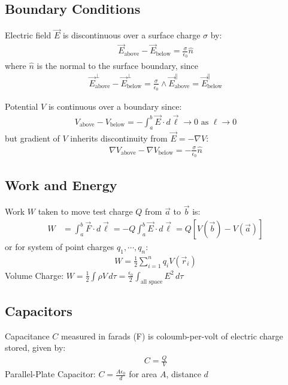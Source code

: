 \documentclass[12pt, a4paper]{article}
\begin{document}
\begin{multicols*}{3}
\subsection{Boundary Conditions}

Electric field $\vec{E}$ is discontinuous over a surface charge $\sigma$ by:
\begin{align*}
  \vec{E}_{\text{above}} - \vec{E}_{\text{below}} = \frac{\sigma}{\epsilon_0} \hat{n}
\end{align*}
where $\hat{n}$ is the normal to the surface boundary, since
\begin{align*}
    \vec{E}^{\perp}_{\text{above}} - \vec{E}^{\perp}_{\text{below}} = \frac{\sigma}{\epsilon_0} \land \vec{E}^{\parallel}_{\text{above}} = \vec{E}^{\parallel}_{\text{below}}
\end{align*}

Potential $V$ is continuous over a boundary since:
\begin{align*}
  V_{\text{above}} - V_{\text{below}} = -\int^b_a \vec{E}\cdot d \vec{\ell} \rightarrow 0 \text{ as } \ell \rightarrow 0
\end{align*}
but gradient of $V$ inherits discontinuity from $\vec{E} = -\nabla V$:
\begin{align*}
  \nabla V_{\text{above}} - \nabla V_{\text{below}} = -\frac{\sigma}{\epsilon_0} \hat{n} 
\end{align*}

\subsection{Work and Energy}
Work $W$ taken to move test charge $Q$ from $\vec{a}$ to $\vec{b}$ is:
\begin{align*}
  W &= \int^b_a \vec{F}\cdot d \vec{\ell} = -Q\int^b_a \vec{E}\cdot d\vec{\ell} = Q[V(\vec{b})- V(\vec{a})]
\end{align*}
or for system of point charges $q_1,\cdots,q_n$:
\begin{align*}
  W = \frac{1}{2}\sum^n_{i=1}q_i V(\vec{r}_i)
\end{align*}
Volume Charge: $\displaystyle W = \frac{1}{2}\int\rho V\, d\tau = \frac{\epsilon_0}{2}\int_{\text{all space}}E^2\, d\tau$

\subsection{Capacitors}
Capacitance $C$ measured in farads (F) is coloumb-per-volt of electric charge stored, given by:
\begin{align*}
  C = \frac{Q}{V}
\end{align*}
Parallel-Plate Capacitor: $\displaystyle C = \frac{A\epsilon_0}{d}$ for area $A$, distance $d$


\end{multicols*}
\end{document}
